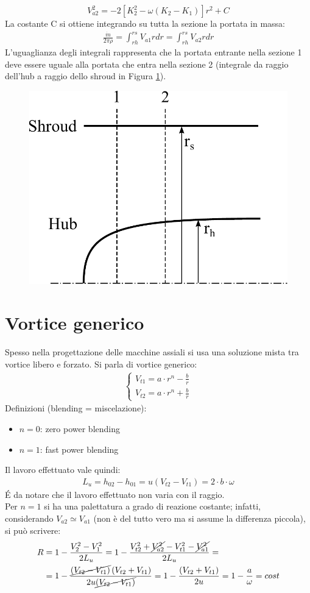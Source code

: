 \begin{equation}
\boxed{V_{a2}^2 = -2 \left[ K_2^2 - \omega \left( K_2 - K_1 \right) \right] r^2 + C}
\label{eq:valleVorticeForzato}
\end{equation}
La costante C si ottiene integrando su tutta la sezione la portata in massa:
\begin{align*}
\frac{\dot{m}}{2 \pi \rho} = \int_{rh}^{rs} V_{a1} r dr = \int_{rh}^{rs} V_{a2} r dr
\end{align*}
L'uguaglianza degli integrali rappresenta che la portata entrante nella sezione 1 deve essere uguale alla portata che entra nella sezione 2 (integrale da raggio dell'hub a raggio dello shroud in Figura \ref{fig:hubshroud}).
\begin{figure}[h]
\centering
  \includegraphics[width=.4\textwidth]{fig/HubShroud.pdf}
\caption{}
\label{fig:hubshroud}
\end{figure}
\section{Vortice generico}
Spesso nella progettazione delle macchine assiali si usa una soluzione mista tra vortice libero e forzato. Si parla di vortice generico:
\begin{align*}
\begin{cases}
V_{t1} = a \cdot r^n - \frac{b}{r}\\
V_{t2} = a \cdot r^n + \frac{b}{r}
\end{cases}
\end{align*}
Definizioni (blending = miscelazione):
\begin{itemize}
\item $n=0$: zero power blending
\item $n=1$: fast power blending
\end{itemize}
Il lavoro effettuato vale quindi:
\begin{align*}
L_u = h_{02} - h_{01} = u \left( V_{t2} - V_{t1} \right) = 2 \cdot b \cdot \omega
\end{align*}
\'E da notare che il lavoro effettuato non varia con il raggio.\\
Per $n=1$ si ha una palettatura a grado di reazione costante; infatti, considerando $V_{a2} \simeq V_{a1}$ (non è del tutto vero ma si assume la differenza piccola), si può scrivere:
\begin{align*}
\begin{split}
	R &= 1 - \frac{V_2^2 - V_1^2}{2 L_u} = 1 - \frac{V_{t2}^2 + \cancel{V_{a2}^2} - V_{t1}^2 - \cancel{V_{a1}^2}}{2 L_u}=\\
	 &= 1 - \frac{\cancel{\left( V_{t2} - V_{t1} \right)} \left( V_{t2}+ V_{t1} \right)}{2 u \cancel{\left( V_{t2}- V_{t1} \right)}} = 1- \frac{\left( V_{t2}+ V_{t1} \right)}{2 u} = 1-\frac{a}{\omega} = cost
\end{split}
\end{align*}

